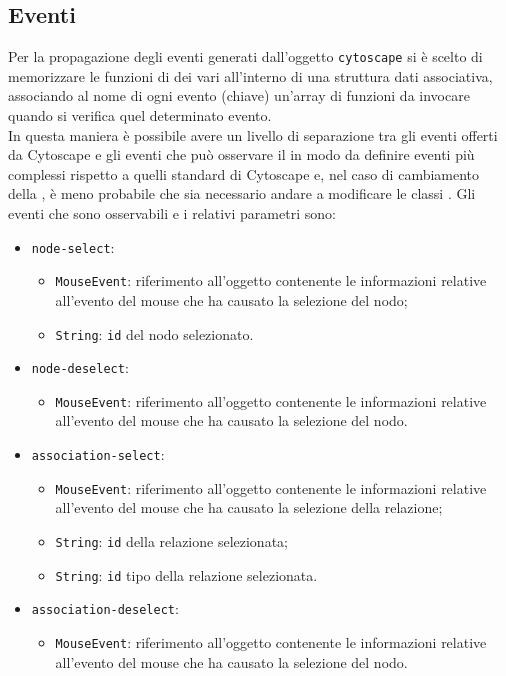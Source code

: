 \subsection{Eventi}
Per la propagazione degli eventi generati dall'oggetto \texttt{cytoscape} si è scelto di memorizzare le funzioni di  dei vari \textit{} all'interno di una struttura dati associativa, associando al nome di ogni evento (chiave) un'array di funzioni da invocare quando si verifica quel determinato evento.\\
In questa maniera è possibile avere un livello di separazione tra gli eventi offerti da Cytoscape e gli eventi che può osservare il  in modo da definire eventi più complessi rispetto a quelli standard di Cytoscape e, nel caso di cambiamento della , è meno probabile che sia necessario andare a modificare le classi \textit{}.
Gli eventi che sono osservabili e i relativi parametri sono:
\begin{itemize}
\item \texttt{node-select}:
\begin{itemize}
\item \texttt{MouseEvent}: riferimento all'oggetto contenente le informazioni relative all'evento del mouse che ha causato la selezione del nodo;
\item \texttt{String}: \texttt{id} del nodo selezionato.
\end{itemize}
\item \texttt{node-deselect}:
\begin{itemize}
\item \texttt{MouseEvent}: riferimento all'oggetto contenente le informazioni relative all'evento del mouse che ha causato la selezione del nodo.
\end{itemize}
\item \texttt{association-select}:
\begin{itemize}
\item \texttt{MouseEvent}: riferimento all'oggetto contenente le informazioni relative all'evento del mouse che ha causato la selezione della relazione;
\item \texttt{String}: \texttt{id} della relazione selezionata;
\item \texttt{String}: \texttt{id} tipo della relazione selezionata.
\end{itemize}
\item \texttt{association-deselect}:
\begin{itemize}
\item \texttt{MouseEvent}: riferimento all'oggetto contenente le informazioni relative all'evento del mouse che ha causato la selezione del nodo.
\end{itemize}
\end{itemize}
